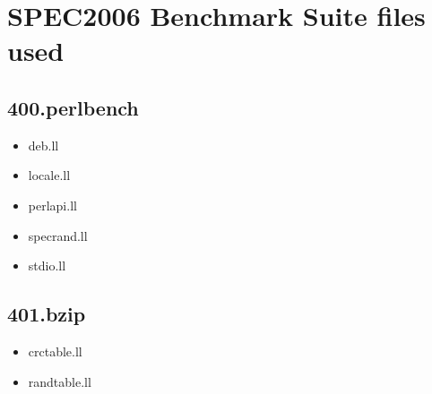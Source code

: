 
\clearpage
\section{SPEC2006 Benchmark Suite files used}
\label{app:SPEC2006_files_used}

\begin{multicols}{3}
	\subsection{400.perlbench}
	\begin{itemize}
		\item deb.ll
		\item locale.ll
		\item perlapi.ll
		\item specrand.ll
		\item stdio.ll
	\end{itemize}

	\subsection{401.bzip}
	\begin{itemize}
		\item crctable.ll
		\item randtable.ll
	\end{itemize}


\end{multicols}
